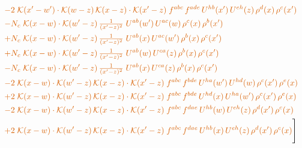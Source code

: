 \documentclass[10pt]{article}
\numberwithin{equation}{section}
\begin{document}
\begin{align}
&\quad{\color{BFK}-2\;\mathcal{K}(x'-w')\cdot\mathcal{K}(w-z)\,\mathcal{K}(x-z)\cdot\mathcal{K}(x'-z)\;f^{abc}\,f^{ade}\,U^{hb}(x')\,U^{eh}(z)\,\rho^{d}(x)\,\rho^{c}(x')}\notag\\
&\quad{\color{BFK}-N_c\;\mathcal{K}(x-w)\cdot\mathcal{K}(w'-z)\,\tfrac{1}{(x'-z)^{2}}\;U^{ab}(w')\,U^{ac}(w)\,\rho^{c}(x)\,\rho^{b}(x')}\notag\\
&\quad{\color{BFK}+N_c\;\mathcal{K}(x-w)\cdot\mathcal{K}(w'-z)\,\tfrac{1}{(x'-z)^{2}}\;U^{ab}(x)\,U^{ac}(w')\,\rho^{b}(x)\,\rho^{c}(x')}\notag\\
&\quad{\color{BFK}+N_c\;\mathcal{K}(x-w)\cdot\mathcal{K}(w'-z)\,\tfrac{1}{(x'-z)^{2}}\;U^{ab}(w)\,U^{ca}(z)\,\rho^{b}(x)\,\rho^{c}(x')}\notag\\
&\quad{\color{BFK}-N_c\;\mathcal{K}(x-w)\cdot\mathcal{K}(w'-z)\,\tfrac{1}{(x'-z)^{2}}\;U^{ab}(x)\,U^{ca}(z)\,\rho^{b}(x)\,\rho^{c}(x')}\notag\\
&\quad{\color{BFK}-2\;\mathcal{K}(x-w)\cdot\mathcal{K}(w'-z)\,\mathcal{K}(x-z)\cdot\mathcal{K}(x'-z)\;f^{abc}\,f^{bde}\,U^{ha}(w')\,U^{hd}(w)\,\rho^{c}(x')\,\rho^{e}(x)}\notag\\
&\quad{\color{BFK}+2\;\mathcal{K}(x-w)\cdot\mathcal{K}(w'-z)\,\mathcal{K}(x-z)\cdot\mathcal{K}(x'-z)\;f^{abc}\,f^{bde}\,U^{hd}(x)\,U^{ha}(w')\,\rho^{c}(x')\,\rho^{e}(x)}\notag\\
&\quad{\color{BFK}-2\;\mathcal{K}(x-w)\cdot\mathcal{K}(w'-z)\,\mathcal{K}(x-z)\cdot\mathcal{K}(x'-z)\;f^{abc}\,f^{dae}\,U^{hb}(w)\,U^{eh}(z)\,\rho^{d}(x')\,\rho^{c}(x)}\notag\\
&\quad{\color{BFK}+2\;\mathcal{K}(x-w)\cdot\mathcal{K}(w'-z)\,\mathcal{K}(x-z)\cdot\mathcal{K}(x'-z)\;f^{abc}\,f^{dae}\,U^{hb}(x)\,U^{eh}(z)\,\rho^{d}(x')\,\rho^{c}(x)}\Bigg]\label{eq:Bsum}
\end{align}

\end{document}
